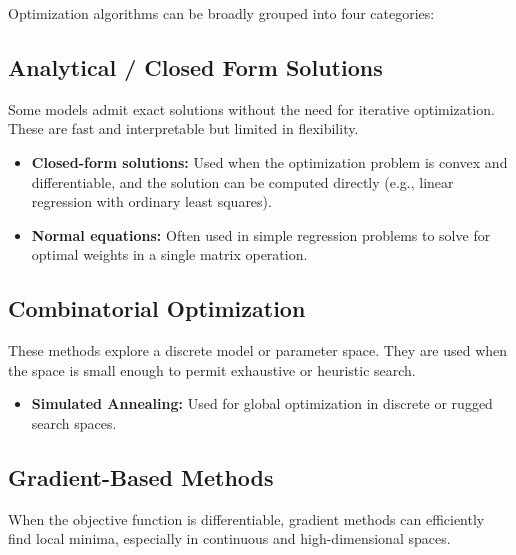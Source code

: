 \documentclass[12pt,openany]{book}
\begin{document}
Optimization algorithms can be broadly grouped into four categories:

\subsection{Analytical / Closed Form Solutions}

Some models admit exact solutions without the need for iterative optimization. These are fast and interpretable but limited in flexibility.

\begin{itemize}
    \item \textbf{Closed-form solutions:} Used when the optimization problem is convex and differentiable, and the solution can be computed directly (e.g., linear regression with ordinary least squares).
    \item \textbf{Normal equations:} Often used in simple regression problems to solve for optimal weights in a single matrix operation.
\end{itemize}

\subsection{Combinatorial Optimization}

These methods explore a discrete model or parameter space. They are used when the space is small enough to permit exhaustive or heuristic search.

\begin{itemize}
    \item \textbf{Simulated Annealing:} Used for global optimization in discrete or rugged search spaces.
\end{itemize}

\subsection{Gradient-Based Methods}

When the objective function is differentiable, gradient methods can efficiently find local minima, especially in continuous and high-dimensional spaces.
\end{document}
